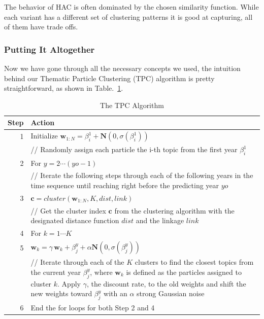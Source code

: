 \documentclass[conference]{IEEEtran}
\begin{document}
 The behavior of HAC is often dominated by the chosen similarity function. While each variant has a different set of clustering patterns it is good at capturing, all of them have trade offs. 

\subsubsection{Putting It Altogether}

Now we have gone through all the necessary concepts we used, the intuition behind our Thematic Particle Clustering (TPC) algorithm is pretty straightforward, as shown in Table.~\ref{TPC_algorithm}.

\begin{table}[h]
	\centering
	\begin{tabular}{r|p{7.25cm}}
		Step & Action\\
		\hline
		\hline
		1 & Initialize $\mathbf{w}_{1:N}=\beta^1_i + \mathbf{N}(0,\sigma(\beta^1_i))$ \\
		 & // Randomly assign each particle the i-th topic from the first year $\beta^1_i$\\
		 \hline
		2 & For $y = 2 \cdots (yo - 1)$\\
		 & // Iterate the following steps through each of the following years in the time sequence until reaching right before the predicting year $yo$\\
		 \hline
		3 & $\mathbf{c}=cluster(\mathbf{w}_{1:N}, K, dist, link)$\\
		& // Get the cluster index $\mathbf{c}$ from the clustering algorithm with the designated distance function $dist$ and the linkage $link$\\
		\hline
		4 & For $k = 1 \cdots K$ \\
		\hline
		5 & $\mathbf{w}_k = \gamma \, \mathbf{w}_k + \beta^y_j + \alpha\mathbf{N}(0,\sigma(\beta^y_j))$\\
		& // Iterate through each of the $K$ clusters to find the closest topics from the current year $\beta^y_j$, where $\mathbf{w}_k$ is defined as the particles assigned to cluster $k$. Apply $\gamma$, the discount rate, to the old weights and shift the new weights toward $\beta^y_j$ with an $\alpha$ strong Gaussian noise\\
		\hline
		6 & End the for loops for both Step 2 and 4\\
	\end{tabular}
	\caption{The TPC Algorithm}
	\label{TPC_algorithm}
\end{table}
\end{document}
